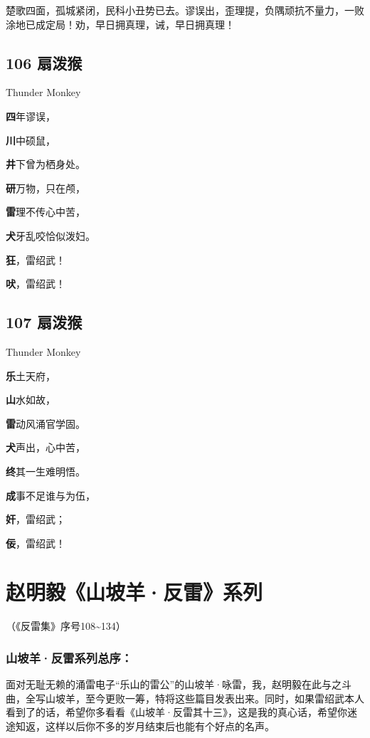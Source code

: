 \documentclass[UTF8,12pt,oneside]{ctexbook}
\def\pau#1{\begin{center} {#1} \end{center}} %
\def\poem#1#2{\section{#1}\pau{#2}} %
\def\lidend{\setlength\parindent{2em}}
\begin{document}
    楚歌四面，孤城紧闭，民科小丑势已去。谬误出，歪理提，负隅顽抗不量力，一败涂地已成定局！劝，早日拥真理，诫，早日拥真理！

\newpage
\poem{106 扇泼猴}{Thunder Monkey}

\setlength\parindent{11em}

    \textbf{四}年谬误，
    
    \textbf{川}中硕鼠，
    
    \textbf{井}下曾为栖身处。
    
    \textbf{研}万物，只在颅，
    
    \textbf{雷}理不传心中苦，
    
    \textbf{犬}牙乱咬恰似泼妇。
    
    \textbf{狂}，雷绍武！
    
    \textbf{吠}，雷绍武！

\poem{107 扇泼猴}{Thunder Monkey}

    \textbf{乐}土天府， 
    
    \textbf{山}水如故， 

    \textbf{雷}动风涌官学固。 

    \textbf{犬}声出，心中苦， 

    \textbf{终}其一生难明悟。 

    \textbf{成}事不足谁与为伍，

    \textbf{奸}，雷绍武； 

    \textbf{佞}，雷绍武！

\lidend

\chapter{赵明毅《山坡羊·反雷》系列}

\begin{center}
    （《反雷集》序号108\textasciitilde134）
\end{center}

\subsection{山坡羊·反雷系列总序：}
  
\kaishu
面对无耻无赖的涌雷电子“乐山的雷公”的山坡羊·咏雷，我，赵明毅在此与之斗曲，全写山坡羊，至今更败一筹，特将这些篇目发表出来。同时，如果雷绍武本人看到了的话，希望你多看看《山坡羊·反雷其十三》，这是我的真心话，希望你迷途知返，这样以后你不多的岁月结束后也能有个好点的名声。
    ~\\
\end{document}

